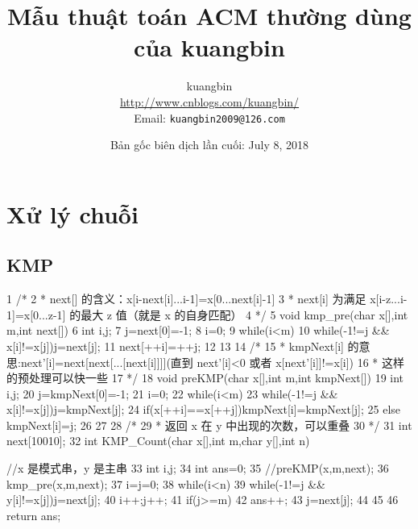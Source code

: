 \documentclass[11pt]{article}
\title{Mẫu thuật toán ACM thường dùng của kuangbin}
\author{kuangbin\\\url{http://www.cnblogs.com/kuangbin/}\\Email: \texttt{kuangbin2009@126.com}}
\date{Bản gốc biên dịch lần cuối: July 8, 2018}
\begin{document}
\maketitle
\tableofcontents
\clearpage

\section{Xử lý chuỗi}

\subsection{KMP}

\begin{Code}
 1   /*
 2    * next[] 的含义：x[i-next[i]...i-1]=x[0...next[i]-1]
 3    * next[i] 为满足 x[i-z...i-1]=x[0...z-1] 的最大 z 值（就是 x 的自身匹配）
 4    */
 5   void kmp_pre(char x[],int m,int next[]){
 6        int i,j;
 7        j=next[0]=-1;
 8        i=0;
 9        while(i<m){
10            while(-1!=j && x[i]!=x[j])j=next[j];
11            next[++i]=++j;
12        }
13   }
14   /*
15     * kmpNext[i] 的意思:next'[i]=next[next[...[next[i]]]](直到
          next'[i]<0 或者 x[next'[i]]!=x[i])
16     * 这样的预处理可以快一些
17     */
18   void preKMP(char x[],int m,int kmpNext[]){
19        int i,j;
20        j=kmpNext[0]=-1;
21        i=0;
22        while(i<m){
23            while(-1!=j && x[i]!=x[j])j=kmpNext[j];
24            if(x[++i]==x[++j])kmpNext[i]=kmpNext[j];
25            else kmpNext[i]=j;
26        }
27   }
28   /*
29     * 返回 x 在 y 中出现的次数，可以重叠
30     */
31   int next[10010];
32   int KMP_Count(char x[],int m,char y[],int n){//x 是模式串，y 是主串
33        int i,j;
34        int ans=0;
35        //preKMP(x,m,next);
36        kmp_pre(x,m,next);
37        i=j=0;
38        while(i<n){
39            while(-1!=j && y[i]!=x[j])j=next[j];
40            i++;j++;
41            if(j>=m){
42                 ans++;
43                 j=next[j];
44            }
45        }
46        return ans;


}
\end{Code}
\end{document}
